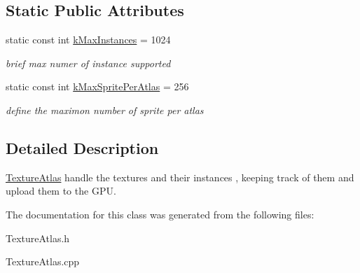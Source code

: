 \subsection*{Static Public Attributes}
\begin{DoxyCompactItemize}
\item 
\hypertarget{class_texture_atlas_a2f7a634462064e7715e58eb15fb13bdd}{static const int \hyperlink{class_texture_atlas_a2f7a634462064e7715e58eb15fb13bdd}{k\-Max\-Instances} = 1024}\label{class_texture_atlas_a2f7a634462064e7715e58eb15fb13bdd}

\begin{DoxyCompactList}\small\item\em brief max numer of instance supported \end{DoxyCompactList}\item 
\hypertarget{class_texture_atlas_a94887a34f2e8a2b3ffa794e3561619d4}{static const int \hyperlink{class_texture_atlas_a94887a34f2e8a2b3ffa794e3561619d4}{k\-Max\-Sprite\-Per\-Atlas} = 256}\label{class_texture_atlas_a94887a34f2e8a2b3ffa794e3561619d4}

\begin{DoxyCompactList}\small\item\em define the maximon number of sprite per atlas \end{DoxyCompactList}\end{DoxyCompactItemize}


\subsection{Detailed Description}
\hyperlink{class_texture_atlas}{Texture\-Atlas} handle the textures and their instances , keeping track of them and upload them to the G\-P\-U. 

The documentation for this class was generated from the following files\-:\begin{DoxyCompactItemize}
\item 
Texture\-Atlas.\-h\item 
Texture\-Atlas.\-cpp\end{DoxyCompactItemize}
